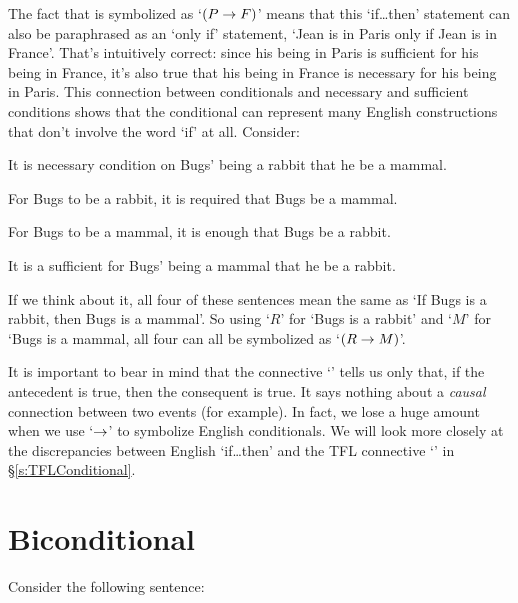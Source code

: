 The fact that  is symbolized as `$(P \rightarrow F)$' means that this `if\ldots then' statement can also be paraphrased as an `only if' statement, `Jean is in Paris only if Jean is in France'.  That's intuitively correct: since his being in Paris is sufficient for his being in France, it's also true that his being in France is necessary for his being in Paris. This connection between conditionals and necessary and sufficient conditions shows that the conditional can represent many English constructions that don't involve the word `if' at all.  Consider:

	\begin{earg}
		\item[\ex{ifnc1}] It is necessary condition on Bugs' being a rabbit that he be a mammal. 
		\item[\ex{ifnc2}] For Bugs to be a rabbit, it is required that Bugs be a mammal.
		\item[\ex{ifnc3}] For Bugs to be a mammal, it is enough that Bugs be a rabbit.
		\item[\ex{ifnc4}] It is a sufficient for Bugs' being a mammal that he be a rabbit.
	\end{earg}
If we think about it, all four of these sentences mean the same as  `If Bugs is a rabbit, then Bugs is a mammal'. So using `$R$' for `Bugs is a rabbit' and `$M$' for `Bugs is a mammal, all four can all be symbolized as `$(R \rightarrow M)$'. 

It is important to bear in mind that the connective `\eif' tells us only that, if the antecedent is true, then the consequent is true. It says nothing about a \emph{causal} connection between two events (for example). In fact, we lose a huge amount when we use `$\rightarrow$' to symbolize English conditionals. We will look more closely at the discrepancies between English `if\ldots then' and the TFL connective `\eif' in \S\ref{s:TFLConditional}.

\section{Biconditional}
Consider the following sentence:

